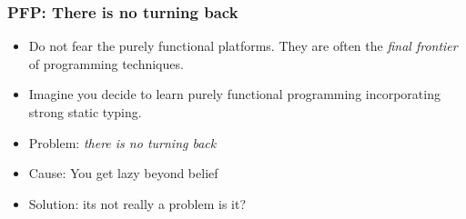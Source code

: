 \documentclass[11pt]{beamer}
\begin{document}
\begin{frame}
	\frametitle{PFP: There is no turning back}
	\begin{itemize}[<+->]
		\item Do not fear the purely functional platforms. They are often the \textit{final frontier} of programming techniques.
		\item Imagine you decide to learn purely functional programming incorporating strong static typing.
		\item Problem: \textit{there is no turning back}
		\item Cause: You get lazy beyond belief
		\item Solution: its not really a problem is it?
	\end{itemize}
\end{frame}
\end{document}
